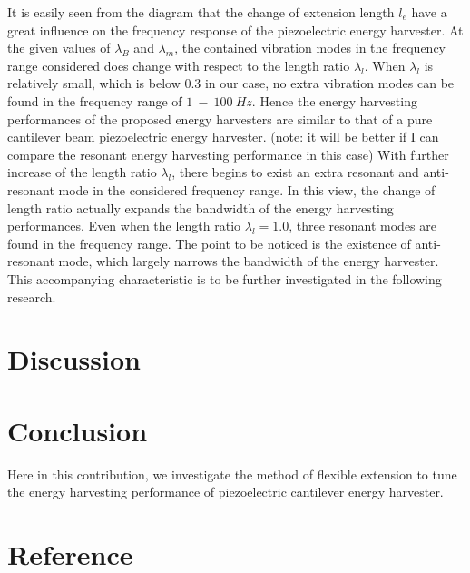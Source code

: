 \documentclass{elsarticle}
\begin{document}
It is easily seen from the diagram that the change of extension length $l_e$ have a great influence on the frequency response of the piezoelectric energy harvester. At the given values of $\lambda_B$ and $\lambda_m$, the contained vibration modes in the frequency range considered does change with respect to
the length ratio $\lambda_l$. When $\lambda_l$ is relatively small, which is below $0.3$ in our case, no extra vibration modes can be found in the frequency range of $1\ - \ 100\ Hz$. Hence the energy harvesting performances of the proposed energy harvesters are similar to that of a pure cantilever beam piezoelectric energy harvester. (note: it will be better if I can compare the resonant energy harvesting performance in this case) With further increase of the length ratio $\lambda_l$, there begins to exist an extra resonant and anti-resonant mode in the considered frequency range. In this view, the change of length ratio actually expands the bandwidth of the energy harvesting performances. Even when the length ratio $\lambda_l = 1.0$, three resonant modes are found in the frequency range. The point to be noticed is the existence of anti-resonant mode, which largely narrows the bandwidth of the energy harvester. This accompanying characteristic is to be further investigated in the following research. 


\section{Discussion}



\section{Conclusion}

Here in this contribution, we investigate the method of flexible extension to tune the energy harvesting performance of piezoelectric cantilever energy harvester.


\section*{Reference}



\end{document}
